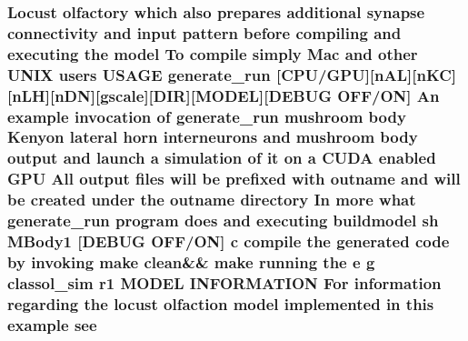 \hypertarget{userproject_2MBody1__project_2README_8txt_a7623704c3180122db9ddbc877ff0fb32}{
\subsubsection[{see}]{\setlength{\rightskip}{0pt plus 5cm}Locust olfactory which also prepares additional synapse connectivity and input pattern before compiling and executing the {\bf model} To compile simply Mac and other U\+N\+I\+X users U\+S\+A\+G\+E {\bf generate\+\_\+run} \mbox{[}{\bf C\+P\+U}/{\bf G\+P\+U}\mbox{]}\mbox{[}n\+A\+L\mbox{]}\mbox{[}n\+K\+C\mbox{]}\mbox{[}n\+L\+H\mbox{]}\mbox{[}n\+D\+N\mbox{]}\mbox{[}gscale\mbox{]}\mbox{[}D\+I\+R\mbox{]}\mbox{[}M\+O\+D\+E\+L\mbox{]}\mbox{[}D\+E\+B\+U\+G O\+F\+F/O\+N\mbox{]} An example invocation of {\bf generate\+\_\+run} mushroom body Kenyon lateral horn {\bf interneurons} and mushroom body output and launch a simulation of {\bf it} on a C\+U\+D\+A enabled {\bf G\+P\+U} All output files will be prefixed {\bf with} outname and will be created under the outname {\bf directory} In more what {\bf generate\+\_\+run} program does and executing buildmodel sh M\+Body1 \mbox{[}D\+E\+B\+U\+G O\+F\+F/O\+N\mbox{]} c compile the generated {\bf code} by invoking make clean\&\& make running the e g classol\+\_\+sim r1 M\+O\+D\+E\+L I\+N\+F\+O\+R\+M\+A\+T\+I\+O\+N For information regarding the locust olfaction {\bf model} implemented {\bf in} this example see}}\label{userproject_2MBody1__project_2README_8txt_a7623704c3180122db9ddbc877ff0fb32}
